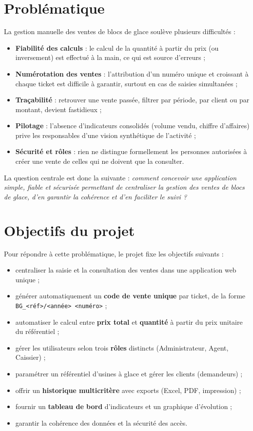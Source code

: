 \section{Problématique}

La gestion manuelle des ventes de blocs de glace soulève plusieurs difficultés :

\begin{itemize}
  \item \textbf{Fiabilité des calculs} : le calcul de la quantité à partir du prix (ou inversement) est effectué à la main, ce qui est source d'erreurs ;
  \item \textbf{Numérotation des ventes} : l'attribution d'un numéro unique et croissant à chaque ticket est difficile à garantir, surtout en cas de saisies simultanées ;
  \item \textbf{Traçabilité} : retrouver une vente passée, filtrer par période, par client ou par montant, devient fastidieux ;
  \item \textbf{Pilotage} : l'absence d'indicateurs consolidés (volume vendu, chiffre d'affaires) prive les responsables d'une vision synthétique de l'activité ;
  \item \textbf{Sécurité et rôles} : rien ne distingue formellement les personnes autorisées à créer une vente de celles qui ne doivent que la consulter.
\end{itemize}

La question centrale est donc la suivante : \emph{comment concevoir une application simple, fiable et sécurisée permettant de centraliser la gestion des ventes de blocs de glace, d'en garantir la cohérence et d'en faciliter le suivi ?}

\section{Objectifs du projet}

Pour répondre à cette problématique, le projet fixe les objectifs suivants :

\begin{itemize}
  \item centraliser la saisie et la consultation des ventes dans une application web unique ;
  \item générer automatiquement un \textbf{code de vente unique} par ticket, de la forme \texttt{BG\_<réf>/<année> <numéro>} ;
  \item automatiser le calcul entre \textbf{prix total} et \textbf{quantité} à partir du prix unitaire du référentiel ;
  \item gérer les utilisateurs selon trois \textbf{rôles} distincts (Administrateur, Agent, Caissier) ;
  \item paramétrer un référentiel d'usines à glace et gérer les clients (demandeurs) ;
  \item offrir un \textbf{historique multicritère} avec exports (Excel, PDF, impression) ;
  \item fournir un \textbf{tableau de bord} d'indicateurs et un graphique d'évolution ;
  \item garantir la cohérence des données et la sécurité des accès.
\end{itemize}


